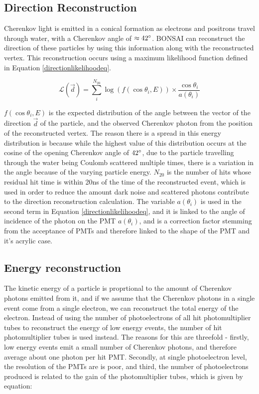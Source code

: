 \subsection{Direction Reconstruction}

Cherenkov light is emitted in a conical formation as electrons and positrons travel through water, with a Cherenkov angle of $\approx 42\degree$. BONSAI can reconstruct the direction of these particles by using this information along with the reconstructed vertex. This reconstruction occurs using a maximum likelihood function defined in Equation \ref{directionlikelihoodeq}.

\begin{equation}
    \mathcal{L}(\vec{d})=\sum_{i}^{N_{20}} \log (f(\cos\theta_{i}, E))\times\frac{\cos\theta_{i}}{a(\theta_{i})}
    \label{directionlikelihoodeq}
\end{equation}

$f(\cos\theta_{i},E)$ is the expected distribution of the angle between the vector of the direction $\vec{d}$ of the particle, and the observed Cherenkov photon from the position of the reconstructed vertex. The reason there is a spread in this energy distribution is because while the highest value of this distribution occurs at the cosine of the opening Cherenkov angle of $42\degree$, due to the particle travelling through the water being Coulomb scattered multiple times, there is a variation in the angle because of the varying particle energy. $N_{20}$ is the number of hits whose residual hit time is within 20ns of the time of the reconstructed event, which is used in order to reduce the amount dark noise and scattered photons contribute to the direction reconstruction calculation. The  variable $a(\theta_{i})$ is used in the second term in Equation \ref{directionlikelihoodeq}, and it is linked to the angle of incidence of the photon on the PMT $a(\theta_{i})$, and is a correction factor stemming from the acceptance of PMTs and therefore linked to the shape of the PMT and it's acrylic case. 


\subsection{Energy reconstruction}

The kinetic energy of a particle is proprtional to the amount of Cherenkov photons emitted from it, and if we assume that the Cherenkov photons in a single event come from a single electron, we can reconstruct the total energy of the electron. Instead of using the number of photoelectrons of all hit photomultiplier tubes to reconstruct the energy of low energy events, the number of hit photomultiplier tubes is used instead. The reasons for this are threefold - firstly, low energy events emit a small number of Cherenkov photons, and therefore average about one photon per hit PMT. Secondly, at single photoelectron level, the resolution of the PMTs are is poor, and third, the number of photoelectrons produced is related to the gain of the photomultiplier tubes, which is given by equation:

